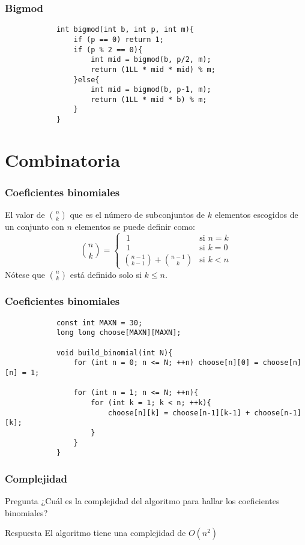 \documentclass{beamer}
\begin{document}
	\begin{frame}[fragile]
		\frametitle{Bigmod}
		\begin{lstlisting}
			int bigmod(int b, int p, int m){
			    if (p == 0) return 1;
			    if (p % 2 == 0){
			        int mid = bigmod(b, p/2, m);
			        return (1LL * mid * mid) % m;
			    }else{
			        int mid = bigmod(b, p-1, m);
			        return (1LL * mid * b) % m;
			    }
			}
		\end{lstlisting}
	\end{frame}

\section[Combinatoria]{Combinatoria}

	\begin{frame}
		\frametitle{Coeficientes binomiales}
		El valor de $\displaystyle\binom{n}{k}$ que es el número de subconjuntos de $k$ elementos escogidos de un conjunto con $n$ elementos se puede definir como:
		$$ \binom{n}{k} = 
		\begin{cases}
			\,\, 1 & \text{si } n = k \\
			\,\, 1 & \text{si } k = 0 \\
			\displaystyle\binom{n-1}{k-1} + \binom{n-1}{k} & \text{si } k < n
		\end{cases}
		$$
		Nótese que $\displaystyle\binom{n}{k}$ está definido solo si $k \leq n$.
	\end{frame}
	
	\begin{frame}[fragile]
		\frametitle{Coeficientes binomiales}
		\begin{lstlisting}
			const int MAXN = 30;
			long long choose[MAXN][MAXN];

			void build_binomial(int N){
			    for (int n = 0; n <= N; ++n) choose[n][0] = choose[n][n] = 1;

			    for (int n = 1; n <= N; ++n){
			        for (int k = 1; k < n; ++k){
			            choose[n][k] = choose[n-1][k-1] + choose[n-1][k];
			        }
			    }
			}
		\end{lstlisting}
	\end{frame}
	
	\begin{frame}
		\frametitle{Complejidad}
		\begin{alertblock}{Pregunta}
			¿Cuál es la complejidad del algoritmo para hallar los coeficientes binomiales?
		\end{alertblock}
		\pause
		\begin{exampleblock}{Respuesta}
			El algoritmo tiene una complejidad de $O(n^2)$
		\end{exampleblock}
	\end{frame}
	
\end{document}
